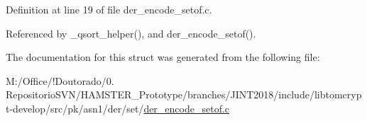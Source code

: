 Definition at line 19 of file der\+\_\+encode\+\_\+setof.\+c.



Referenced by \+\_\+qsort\+\_\+helper(), and der\+\_\+encode\+\_\+setof().



The documentation for this struct was generated from the following file\+:\begin{DoxyCompactItemize}
\item 
M\+:/\+Office/!\+Doutorado/0. Repositorio\+S\+V\+N/\+H\+A\+M\+S\+T\+E\+R\+\_\+\+Prototype/branches/\+J\+I\+N\+T2018/include/libtomcrypt-\/develop/src/pk/asn1/der/set/\mbox{\hyperlink{der__encode__setof_8c}{der\+\_\+encode\+\_\+setof.\+c}}\end{DoxyCompactItemize}
